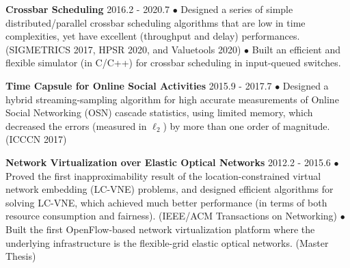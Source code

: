 \documentclass[line,11pt,letter]{includes/cls/myRes}
\begin{document}
\begin{resume}
{\setlength{\parskip}{0pt}
{\bf Crossbar Scheduling} \hfill 2016.2 - 2020.7\break
{\hspace*{1em} $\bullet$ Designed a series of simple distributed/parallel crossbar scheduling algorithms that are low in time complexities, yet have excellent (throughput and delay) performances. (SIGMETRICS 2017, HPSR 2020, and Valuetools 2020)\hfill\break}
{\hspace*{1em} $\bullet$ Built an efficient and flexible simulator (in C/C++) for crossbar scheduling in input-queued switches.\hfill\break}
\sspace
}

{\setlength{\parskip}{0pt}
{\bf Time Capsule for Online Social Activities} \hfill 2015.9 - 2017.7 \break
{\hspace*{1em} $\bullet$ Designed a hybrid streaming-sampling algorithm for high accurate measurements of Online Social Networking (OSN) cascade statistics, using limited memory, which decreased the errors (measured in $\ell_2$) by more than one order of magnitude. (ICCCN 2017)\hfill\break}
\sspace
}

{\setlength{\parskip}{0pt}
{\bf Network Virtualization over Elastic Optical Networks} \hfill 2012.2 - 2015.6\break
{\hspace*{1em} $\bullet$ Proved the first inapproximability result of the location-constrained virtual network embedding (LC-VNE) problems, and designed efficient algorithms for solving LC-VNE, which achieved much better performance (in terms of both resource consumption and fairness). (IEEE/ACM Transactions on Networking)\hfill\break}
{\hspace*{1em} $\bullet$ Built the first OpenFlow-based network virtualization platform where the underlying infrastructure is the flexible-grid elastic optical networks. (Master Thesis)\hfill\break}
}
\negspace

\end{resume}
\end{document}
